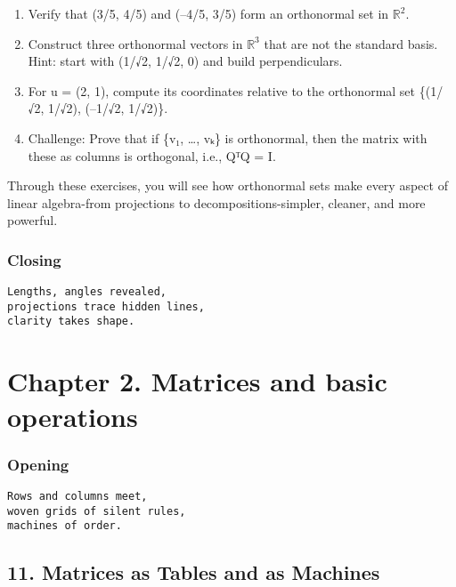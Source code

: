 \documentclass[
  letterpaper,
  DIV=11,
  numbers=noendperiod]{scrreprt}
\providecommand{\tightlist}{%
  \setlength{\itemsep}{0pt}\setlength{\parskip}{0pt}}
\begin{document}
\begin{enumerate}
\def\labelenumi{\arabic{enumi}.}
\tightlist
\item
  Verify that (3/5, 4/5) and (--4/5, 3/5) form an orthonormal set in
  \(\mathbb{R}^2\).
\item
  Construct three orthonormal vectors in \(\mathbb{R}^3\) that are not
  the standard basis. Hint: start with (1/√2, 1/√2, 0) and build
  perpendiculars.
\item
  For u = (2, 1), compute its coordinates relative to the orthonormal
  set \{(1/√2, 1/√2), (--1/√2, 1/√2)\}.
\item
  Challenge: Prove that if \{v₁, \ldots, vₖ\} is orthonormal, then the
  matrix with these as columns is orthogonal, i.e., QᵀQ = I.
\end{enumerate}

Through these exercises, you will see how orthonormal sets make every
aspect of linear algebra-from projections to decompositions-simpler,
cleaner, and more powerful.

\subsubsection{Closing}\label{closing}

\begin{verbatim}
Lengths, angles revealed,
projections trace hidden lines,
clarity takes shape.
\end{verbatim}

\section{Chapter 2. Matrices and basic
operations}\label{chapter-2.-matrices-and-basic-operations-1}

\subsubsection{Opening}\label{opening-1}

\begin{verbatim}
Rows and columns meet,
woven grids of silent rules,
machines of order.
\end{verbatim}

\subsection{11. Matrices as Tables and as
Machines}\label{matrices-as-tables-and-as-machines}
\end{document}
